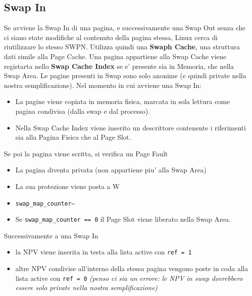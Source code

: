 \documentclass[12pt, a4paper]{report}
\begin{document}
\subsection{Swap In}
Se avviene la Swap In di una pagina, e successivamente una Swap Out senza che ci
siano state modifiche al contenuto della pagina stessa, Linux cerca di
riutilizzare lo stesso SWPN. Utilizza quindi una \textbf{Swaph Cache}, una
struttura dati simile alla Page Cache. Una pagina appartiene alla Swap Cache
viene registarta nello \textbf{Swap Cache Index} se e' presente sia in Memoria,
che nella Swap Area.
Le pagine presenti in Swap sono solo anonime (e quindi private nella nostra
semplificazione). Nel momento in cui avviene una Swap In:
\begin{itemize}
	\item La pagine viene copiata in memoria fisica, marcata in sola lettura
		come pagina condivisa (dalla swap e dal processo).
	\item Nella Swap Cache Index viene inserito un descrittore contenente i
		riferimenti sia alla Pagina Fisica che al Page Slot.
\end{itemize}
Se poi la pagina viene scritta, si verifica un Page Fault
\begin{itemize}
	\item La pagina diventa privata (non appartiene piu' alla Swap Area)
	\item La sua protezione viene posta a W
	\item \texttt{swap\_map\_counter--}
	\item Se \texttt{swap\_map\_counter == 0} il Page Slot viene liberato nella
		Swap Area.
\end{itemize}
Successivamente a una Swap In
\begin{itemize}
	\item la NPV viene inserita in testa alla lista active con \texttt{ref = 1}
	\item altre NPV condivise all'interno della stessa pagina vengono poste in
		coda alla lista active con \texttt{ref = 0} \textit{(penso ci sia un
		errore: le NPV in swap dovrebbero essere solo private nella nostra
		semplificazione)}
\end{itemize}
\end{document}
